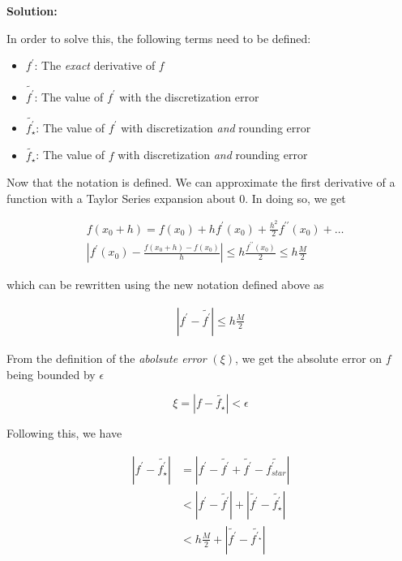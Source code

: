 \documentclass[12pt]{article}
\begin{document}
\begin{enumerate}
\begin{enumerate}
{\bf Solution:}

In order to solve this, the following terms need to be defined:

\begin{itemize}
\item $f^{\prime}$: The {\em exact} derivative of $f$
\item $\widetilde{f^{\prime}}$: The value of $f^{\prime}$ with the discretization error
\item $\widetilde{f^{\prime}_{\star}}$: The value of $f^{\prime}$ with discretization {\em and} rounding error
\item $\widetilde{f_{\star}}$: The value of $f$ with discretization {\em and} rounding error
\end{itemize}

Now that the notation is defined. We can approximate the first derivative of a
function with a Taylor Series expansion about 0. In doing so, we get

\begin{align*}
&f\left(x_{0} + h\right)  = f\left(x_{0}\right) + hf^{\prime}\left(x_{0}\right) + \frac{h^{2}}{2}f^{\prime \prime}\left(x_{0}\right) + \ldots\\
&\left| f^{\prime}\left(x_{0}\right) - \frac{f\left(x_{0}+h\right) - f\left(x_{0}\right)}{h}\right| \leq h\frac{f^{\prime\prime}\left(x_{0}\right)}{2} \leq h\frac{M}{2}
\end{align*}

which can be rewritten using the new notation defined above as

\begin{align*}
\left| f^{\prime} - \widetilde{f^{\prime}} \right| \leq h\frac{M}{2}
\end{align*}

From the definition of the {\em abolsute error} $(\xi)$, we get the absolute error on $f$ being bounded by $\epsilon$

\[
\xi = \left| f - \widetilde{f_{\star}} \right| < \epsilon
\]

Following this, we have

\begin{align*}
\left| f^{\prime} - \widetilde{f^{\prime}_{\star}} \right| &= \left| f^{\prime} - \widetilde{f^{\prime}} + \widetilde{f^{\prime}} -\widetilde{f^{\prime}_{star}} \right|\\
&< \left| f^{\prime} - \widetilde{f^{\prime}} \right| + \left| \widetilde{f^{\prime}} - \widetilde{f^{\prime}_{\star}} \right|\\
&< h\frac{M}{2} + \left| \widetilde{f^{\prime}} - \widetilde{f^{\prime_{\star}}} \right|
\end{align*}


\end{enumerate}
\end{enumerate}
\end{document}
